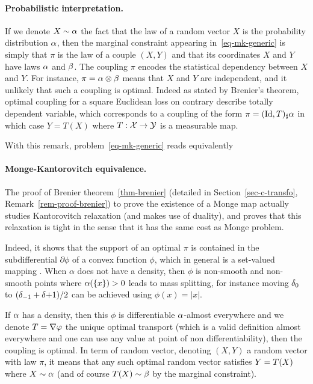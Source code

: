 \paragraph{Probabilistic interpretation.}

If we denote $X \sim \alpha$ the fact that the law of a random vector $X$ is the probability distribution $\alpha$, then the marginal constraint appearing in~\eqref{eq-mk-generic} is simply that $\pi$ is the law of a couple $(X,Y)$ and that its coordinates $X$ and $Y$ have laws $\alpha$ and $\beta$. The coupling $\pi$ encodes the statistical dependency between $X$ and $Y$. For instance, $\pi = \alpha\otimes \beta$ means that $X$ and $Y$ are independent, and it unlikely that such a coupling is optimal. Indeed as stated by Brenier's theorem, optimal coupling for a square Euclidean loss on contrary describe totally dependent variable, which corresponds to a coupling of the form $\pi=(\mathrm{Id},T)_\sharp \alpha$ in which case $Y=T(X)$ where $T: \mathcal{X} \rightarrow \mathcal{Y}$ is a measurable map. 

With this remark, problem~\eqref{eq-mk-generic} reads equivalently 

\paragraph{Monge-Kantorovitch equivalence.}

The proof of Brenier theorem~\ref{thm-brenier}  (detailed in Section~\ref{sec-c-transfo}, Remark~\ref{rem-proof-brenier}) to prove the existence of a Monge map actually studies Kantorovitch relaxation (and makes use of duality), and proves that this relaxation is tight in the sense that it has the same cost as Monge problem. 

Indeed, it shows that the support of an optimal $\pi$ is contained in the subdifferential $\partial \phi$ of a convex function $\phi$, which in general is a set-valued mapping .
%
When $\alpha$ does not have a density, then $\phi$ is non-smooth and non-smooth points where $\alpha(\{x\})>0$ leads to mass splitting, for instance moving $\delta_{0}$ to $(\delta_{-1}+\delta{+1})/2$ can be achieved using $\phi(x)=|x|$.  


If $\alpha$ has a density, then this $\phi$ is differentiable $\alpha$-almost everywhere and we denote $T=\nabla\varphi$ the unique optimal transport (which is a valid definition almost everywhere and one can use any value at point of non differentiability), then the coupling 
is optimal.
In term of random vector, denoting $(X,Y)$ a random vector with law $\pi$, it means that any such optimal random vector satisfies $Y=T(X)$ where $X \sim \alpha$ (and of course $T(X) \sim \beta$ by the marginal constraint). 



